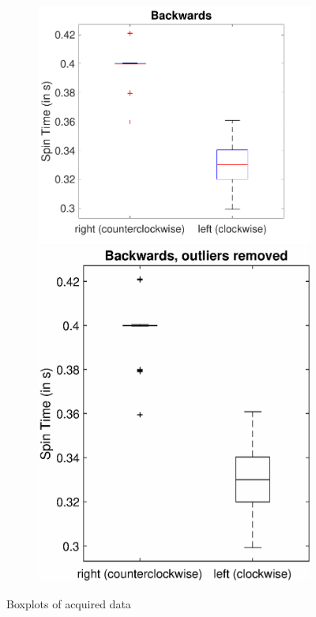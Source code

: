 \documentclass[a4paper,twoside]{book}
\begin{document}
\begin{figure}[h]
\begin{subfigure}[t]{0.4\textwidth}
  \includegraphics[width=\textwidth, center]{img/backwards}\\[1cm]
  \includegraphics[width=\textwidth, center]{img/backwards2}
  \end{subfigure}

  \caption{Boxplots of acquired data}
\end{figure}
\end{document}
